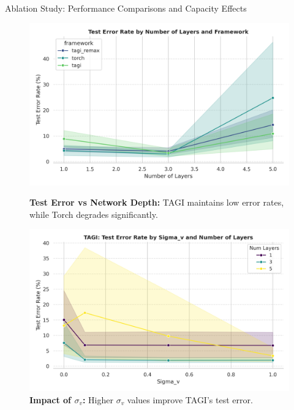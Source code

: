 \documentclass[final]{beamer}
\begin{document}
\begin{frame}[t]
\begin{columns}
\begin{column}[T]{.31\textwidth}
\begin{block}{Ablation Study: Performance Comparisons and Capacity Effects}
\begin{figure}[h]
    \centering
    \begin{minipage}[b]{0.48\textwidth}
        \includegraphics[width=\textwidth]{Figures/num_layers_test_error.png}
        \caption*{\textbf{Test Error vs Network Depth:} TAGI maintains low error rates, while Torch degrades significantly.}
    \end{minipage}\hfill
    \begin{minipage}[b]{0.48\textwidth}
        \includegraphics[width=\textwidth]{Figures/tagi_sigma_comparison.png}
        \caption*{\textbf{Impact of $\sigma_v$:} Higher $\sigma_v$ values improve TAGI's test error.}
    \end{minipage}
\end{figure}





\end{block}
\end{column}
\end{columns}
\end{frame}
\end{document}
